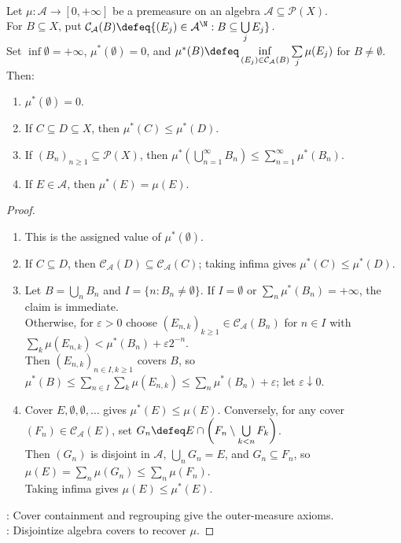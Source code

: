 \begin{lemma} \label{lem:generated-outer-measure-basic-properties} \\
Let $\mu:\mathcal{A}\to[0,+\infty]$ be a premeasure on an algebra $\mathcal{A}\subseteq\mathcal{P}(X)$.\\
For $B\subseteq X$, put $\mathcal{C}_{\mathcal{A}}(B)\defeq\{(E_j)\in\mathcal{A}^{\N}:B\subseteq\bigcup\limits_jE_j\}$.\\
Set $\inf\emptyset=+\infty$, $\mu^\ast(\emptyset)=0$, and $\mu^\ast(B)\defeq\inf\limits_{(E_j)\in\mathcal{C}_{\mathcal{A}}(B)}\sum\limits_j\mu(E_j)$ for $B\neq\emptyset$. Then:
\begin{enumerate}[label=(\roman*)]
\setlength{\itemsep}{0pt}
\item $\mu^\ast(\emptyset)=0$.
\item If $C\subseteq D\subseteq X$, then $\mu^\ast(C)\leq\mu^\ast(D)$.
\item If $(B_n)_{n\geq1}\subseteq\mathcal{P}(X)$, then $\mu^\ast(\bigcup\limits_{n=1}^{\infty}B_n)\leq\sum\limits_{n=1}^{\infty}\mu^\ast(B_n)$.
\item If $E\in\mathcal{A}$, then $\mu^\ast(E)=\mu(E)$.
\end{enumerate}
\begin{proof}
\begin{enumerate}[label=(\roman*)]
\setlength{\itemsep}{0pt}
\item This is the assigned value of $\mu^\ast(\emptyset)$.
\item If $C\subseteq D$, then $\mathcal{C}_{\mathcal{A}}(D)\subseteq\mathcal{C}_{\mathcal{A}}(C)$; taking infima gives $\mu^\ast(C)\leq\mu^\ast(D)$.
\item Let $B=\bigcup\limits_nB_n$ and $I=\{n:B_n\neq\emptyset\}$. If $I=\emptyset$ or $\sum\limits_n\mu^\ast(B_n)=+\infty$, the claim is immediate.\\
Otherwise, for $\varepsilon>0$ choose $(E_{n,k})_{k\geq1}\in\mathcal{C}_{\mathcal{A}}(B_n)$ for $n\in I$ with $\sum\limits_k\mu(E_{n,k})<\mu^\ast(B_n)+\varepsilon2^{-n}$.\\
Then $(E_{n,k})_{n\in I,k\geq1}$ covers $B$, so $\mu^\ast(B)\leq\sum\limits_{n\in I}\sum\limits_k\mu(E_{n,k})\leq\sum\limits_n\mu^\ast(B_n)+\varepsilon$; let $\varepsilon\downarrow0$.
\item Cover $E,\emptyset,\emptyset,\ldots$ gives $\mu^\ast(E)\leq\mu(E)$. Conversely, for any cover $(F_n)\in\mathcal{C}_{\mathcal{A}}(E)$, set $G_n\defeq E\cap\left(F_n\setminus\bigcup\limits_{k<n}F_k\right)$.\\
Then $(G_n)$ is disjoint in $\mathcal{A}$, $\bigcup\limits_nG_n=E$, and $G_n\subseteq F_n$, so $\mu(E)=\sum\limits_n\mu(G_n)\leq\sum\limits_n\mu(F_n)$.\\
Taking infima gives $\mu(E)\leq\mu^\ast(E)$.
\end{enumerate}
: Cover containment and regrouping give the outer-measure axioms.\\
: Disjointize algebra covers to recover $\mu$.
\end{proof}
\end{lemma}


